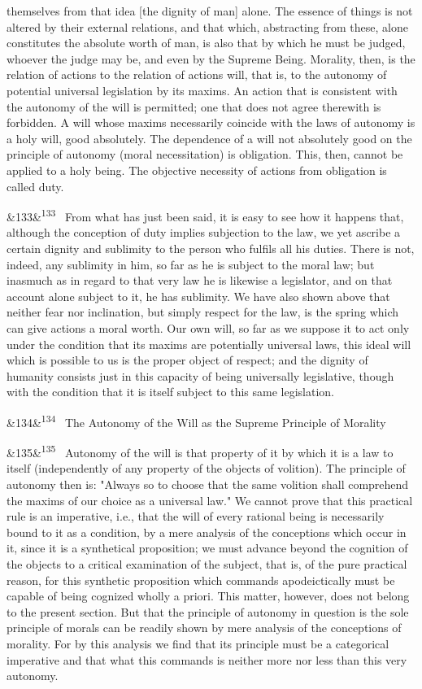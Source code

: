\documentclass[12pt]{article}
\newcommand{\para}[1][]{\par\noindent\ifx&#1&\else\textsuperscript{\footnotesize #1}~\fi}
\begin{document}
themselves from that idea [the dignity of man] alone. The essence of things is not altered by their external relations, and that which, abstracting from these, alone constitutes the absolute worth of man, is also that by which he must be judged, whoever the judge may be, and even by the Supreme Being. Morality, then, is the relation of actions to the relation of actions will, that is, to the autonomy of potential universal legislation by its maxims. An action that is consistent with the autonomy of the will is permitted; one that does not agree therewith is forbidden. A will whose maxims necessarily coincide with the laws of autonomy is a holy will, good absolutely. The dependence of a will not absolutely good on the principle of autonomy (moral necessitation) is obligation. This, then, cannot be applied to a holy being. The objective necessity of actions from obligation is called duty.

\para[133] From what has just been said, it is easy to see how it happens that, although the conception of duty implies subjection to the law, we yet ascribe a certain dignity and sublimity to the person who fulfils all his duties. There is not, indeed, any sublimity in him, so far as he is subject to the moral law; but inasmuch as in regard to that very law he is likewise a legislator, and on that account alone subject to it, he has sublimity. We have also shown above that neither fear nor inclination, but simply respect for the law, is the spring which can give actions a moral worth. Our own will, so far as we suppose it to act only under the condition that its maxims are potentially universal laws, this ideal will which is possible to us is the proper object of respect; and the dignity of humanity consists just in this capacity of being universally legislative, though with the condition that it is itself subject to this same legislation.

\para[134] The Autonomy of the Will as the Supreme Principle of Morality

\para[135] Autonomy of the will is that property of it by which it is a law to itself (independently of any property of the objects of volition). The principle of autonomy then is: "Always so to choose that the same volition shall comprehend the maxims of our choice as a universal law." We cannot prove that this practical rule is an imperative, i.e., that the will of every rational being is necessarily bound to it as a condition, by a mere analysis of the conceptions which occur in it, since it is a synthetical proposition; we must advance beyond the cognition of the objects to a critical examination of the subject, that is, of the pure practical reason, for this synthetic proposition which commands apodeictically must be capable of being cognized wholly a priori. This matter, however, does not belong to the present section. But that the principle of autonomy in question is the sole principle of morals can be readily shown by mere analysis of the conceptions of morality. For by this analysis we find that its principle must be a categorical imperative and that what this commands is neither more nor less than this very autonomy.
\end{document}
